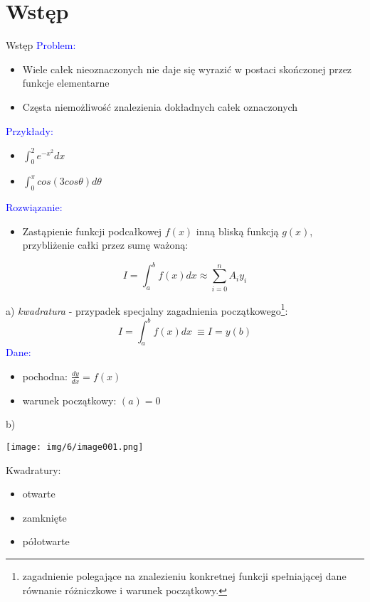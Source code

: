 \section{Wstęp}
	\begin{frame}{Wstęp} 
		\textcolor{blue}{Problem:}

		\begin{itemize}
			\item Wiele całek nieoznaczonych nie daje się wyrazić w postaci skończonej przez funkcje elementarne
			\item Częsta niemożliwość znalezienia dokładnych całek oznaczonych
    	\end{itemize}

		\textcolor{blue}{Przykłady:}
		\begin{itemize}
			\item $\int_{0}^{2}e^{-x^{2}} dx$
			\item $\int_{0}^{\pi}cos(3cos\theta) d\theta$
    	\end{itemize}
    	
    	\textcolor{blue}{Rozwiązanie:}
    	\begin{itemize}
    	\item Zastąpienie funkcji podcałkowej $f(x)$ inną bliską funkcją $g(x)$, przybliżenie całki przez sumę ważoną:
    	\end{itemize}
    	$$I=\int_{a}^{b}f(x)dx \approx\sum_{i=0}^{n}A_{i}y_{i}$$
   	 	
	\end{frame}
	\begin{frame}
    
a) \textit {kwadratura} - przypadek specjalny zagadnienia początkowego\footnote{zagadnienie polegające na znalezieniu konkretnej funkcji spełniającej dane równanie różniczkowe i warunek początkowy.}:
$$
 I=\int_{a}^{b}f(x)dx\ \equiv I=y(b)
$$
\textcolor{blue}{Dane:} 
\begin{itemize}
	\item pochodna: $\displaystyle \frac{dy}{dx}=f(x)$
	\item warunek początkowy: $(a)=0$
  \end{itemize}
\end{frame}
    \begin{frame}
    
      b)
      \begin{center}
      	\texttt{[image: img/6/image001.png]}
      \end{center}
      
      \begin{block}{}
      Kwadratury:
      
        \begin{itemize}
          \item otwarte 
          \item zamknięte
          \item półotwarte
        \end{itemize}
      \end{block}
    \end{frame}

